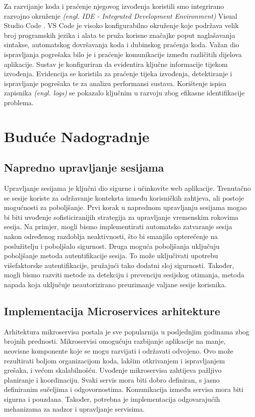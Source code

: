\documentclass[times, utf8, zavrsni]{fer}
\begin{document}
Za razvijanje koda i praćenje njegovog izvođenja koristili smo integrirano razvojno okruženje \textit{(engl. IDE - Integrated Development Environment)} Visual Studio Code \cite{vscode}. VS Code je visoko konfigurabilno okruženje koje podržava velik broj programskih jezika i alata te pruža korisne značajke poput naglašavanja sintakse, automatskog dovršavanja koda i dubinskog praćenja koda. Važan dio ispravljanja pogrešaka bilo je i praćenje komunikacije između različitih dijelova aplikacije. Sustav je konfiguriran da evidentira ključne informacije tijekom izvođenja. Evidencija se koristila za praćenje tijeka izvođenja, detektiranje i ispravljanje pogrešaka te za analizu performansi sustava. Korištenje ispisa zapisnika \textit{(engl. logs)} se pokazalo ključnim u razvoju zbog efikasne identifikacije problema.

\section{Buduće Nadogradnje}

\subsection{Napredno upravljanje sesijama}
Upravljanje sesijama je ključni dio sigurne i učinkovite web aplikacije. Trenutačno se sesije koriste za održavanje konteksta između korisničkih zahtjeva, ali postoje mogućnosti za poboljšanje. Prvi korak u naprednom upravljanju sesijama mogao bi biti uvođenje sofisticiranijih strategija za upravljanje vremenskim rokovima sesija. Na primjer, mogli bismo implementirati automatsko zatvaranje sesija nakon određenog razdoblja neaktivnosti, što bi smanjilo opterećenje na poslužitelju i poboljšalo sigurnost. Druga moguća poboljšanja uključuju poboljšanje metoda autentifikacije sesija. To može uključivati upotrebu višefaktorske autentifikacije, pružajući tako dodatni sloj sigurnosti. Također, mogli bismo razviti metode za detekciju i prevenciju sesijskog otimanja, metoda napada koja uključuje neautorizirano preuzimanje valjane sesije korisnika.

\subsection{Implementacija Microservices arhitekture}
Arhitektura mikroservisa postala je sve popularnija u posljednjim godinama zbog brojnih prednosti. Mikroservisi omogućuju razbijanje aplikacije na manje, neovisne komponente koje se mogu razvijati i održavati odvojeno. Ovo može rezultirati boljom organizacijom koda, lakšim otkrivanjem i ispravljanjem grešaka, i većom skalabilnošću.
Uvođenje mikroservisa zahtijeva pažljivo planiranje i koordinaciju. Svaki servis mora biti dobro definiran, s jasno definiranim sučeljima i odgovornostima. Komunikacija između servisa mora biti sigurna i pouzdana. Također, potrebna je implementacija odgovarajućih mehanizama za nadzor i upravljanje servisima.
\end{document}
